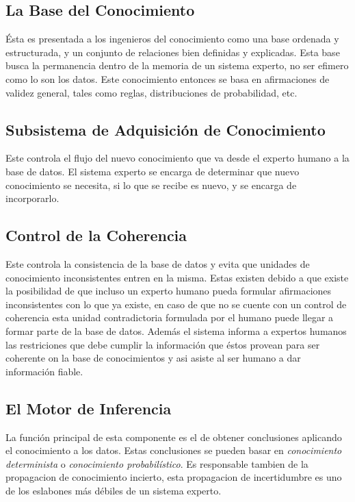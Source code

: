 \documentclass{article}
\begin{document}
\subsection{La Base del Conocimiento}
\label{sub:basecon}
\'Esta es presentada a los ingenieros del conocimiento como una base ordenada y
estructurada, y un conjunto de relaciones bien definidas y explicadas. Esta
base busca la permanencia dentro de la memoria de un sistema experto, no ser
efimero como lo son los datos. Este conocimiento entonces se basa en
afirmaciones de validez general, tales como reglas, distribuciones de
probabilidad, etc.


\subsection{Subsistema de Adquisici\'on de Conocimiento}
\label{sub:adqcono}
Este controla el flujo del nuevo conocimiento que va desde el experto humano a
la base de datos. El sistema experto se encarga de determinar que nuevo
conocimiento se necesita, si lo que se recibe es nuevo, y se encarga de
incorporarlo.

\subsection{Control de la Coherencia}
Este controla la consistencia de la base de datos y evita que unidades de
conocimiento inconsistentes entren en la misma. Estas existen debido a que
existe la posibilidad de que incluso un experto humano pueda formular
afirmaciones inconsistentes con lo que ya existe, en caso de que no se cuente
con un control de coherencia esta unidad contradictoria formulada por el humano
puede llegar a formar parte de la base de datos. Adem\'as el sistema informa a
expertos humanos las restriciones que debe cumplir la informaci\'on que \'estos
provean para ser coherente on la base de conocimientos y asi asiste al ser
humano a dar informaci\'on fiable.

\subsection{El Motor de Inferencia}
\label{sub:motorinf}
La funci\'on principal de esta componente es el de obtener conclusiones
aplicando el conocimiento a los datos. Estas conclusiones se pueden basar en
\textit{conocimiento determinista} o \textit{conocimiento probabil\'istico}. Es
responsable tambien de la propagacion de conocimiento incierto, esta
propagacion de incertidumbre es uno de los eslabones m\'as d\'ebiles de un
sistema experto.
\end{document}
